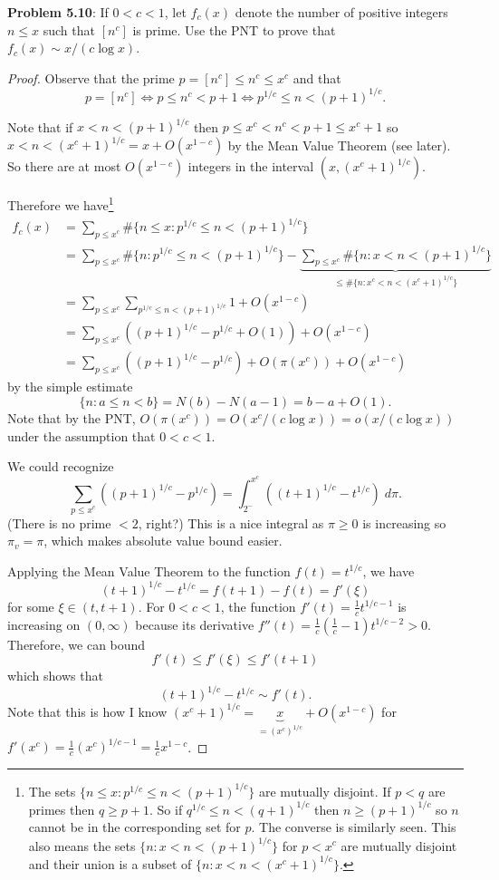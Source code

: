 \documentclass[12pt]{article}
\begin{document}
\fi

\textbf{Problem 5.10}: If $0 < c < 1$, let $f_c(x)$ denote the number of positive integers $n \leq x$ such that $[n^c]$ is prime. Use the PNT to prove that $f_c(x) \sim x/(c \log x)$.

\begin{proof}
Observe that the prime $p = [n^c] \leq n^c \leq x^c$ and that 
$$p = [n^c] \iff p \leq n^c < p + 1 \iff p^{1/c} \leq n < (p + 1)^{1/c}.$$

Note that if $x < n < (p + 1)^{1/c}$ then $p \leq x^c < n^c < p + 1 \leq x^c + 1$ so $x < n < (x^c + 1)^{1/c} = x + O(x^{1-c})$ by the Mean Value Theorem (see later). So there are at most $O(x^{1-c})$ integers in the interval $(x, (x^c + 1)^{1/c})$.

Therefore we have\footnote{The sets $\{n \leq x : p^{1/c} \leq n < (p + 1)^{1/c}\}$ are mutually disjoint. If $p < q$ are primes then $q \geq p + 1$. So if $q^{1/c} \leq n < (q + 1)^{1/c}$ then $n \geq (p + 1)^{1/c}$ so $n$ cannot be in the corresponding set for $p$. The converse is similarly seen. This also means the sets $\{n : x < n < (p+1)^{1/c}\}$ for $p < x^c$ are mutually disjoint and their union is a subset of $\{n : x < n < (x^c + 1)^{1/c}\}$.}
\begin{align*}
f_c(x) &= \sum_{p \leq x^c} \#\{n \leq x : p^{1/c} \leq n < (p + 1)^{1/c}\}\\
&= \sum_{p \leq x^c} \#\{ n : p^{1/c} \leq n < (p + 1)^{1/c} \} - \underbrace{ \sum_{p \leq x^c} \#\{ n : x < n < (p+1)^{1/c} \} }_{\leq \#\{n : x^c < n < (x^c + 1)^{1/c} \}} \\
&= \sum_{p \leq x^c} \sum_{p^{1/c} \leq n < (p + 1)^{1/c}} 1 + O(x^{1-c})\\
&= \sum_{p \leq x^c} \left( (p + 1)^{1/c} - p^{1/c} + O(1) \right) + O(x^{1-c})\\
&= \sum_{p \leq x^c} \left( (p + 1)^{1/c} - p^{1/c} \right) + O(\pi(x^c)) + O(x^{1-c})
\end{align*}
by the simple estimate
$$\{n : a \leq n < b\} = N(b) - N(a - 1) = b - a + O(1).$$
Note that by the PNT, $O(\pi(x^c)) = O(x^c / (c \log x)) = o(x / (c \log x))$ under the assumption that $0 < c < 1$.

We could recognize
$$\sum_{p \leq x^c} \left( (p + 1)^{1/c} - p^{1/c} \right) = \int_{2^-}^{x^c} ((t + 1)^{1/c} - t^{1/c}) \; d \pi.$$
(There is no prime $< 2$, right?) This is a nice integral as $\pi \geq 0$ is increasing so $\pi_v = \pi$, which makes absolute value bound easier.

Applying the Mean Value Theorem to the function $f(t) = t^{1/c}$, we have
$$(t + 1)^{1/c} - t^{1/c} = f(t+1) - f(t) = f'(\xi)$$
for some $\xi \in (t, t+1)$. For $0 < c < 1$, the function $f'(t) = \frac{1}{c} t^{1/c - 1}$ is increasing on $(0, \infty)$ because its derivative $f''(t) = \frac{1}{c} \left( \frac{1}{c} - 1\right) t^{1/c - 2} > 0$. Therefore, we can bound
$$f'(t) \leq f'(\xi) \leq f'(t + 1)$$
which shows that
$$(t + 1)^{1/c} - t^{1/c} \sim f'(t).$$
Note that this is how I know $(x^c + 1)^{1/c} = \underbrace{x}_{= (x^c)^{1/c}} + O(x^{1-c})$ for $f'(x^c) = \frac{1}{c} (x^c)^{1/c - 1} = \frac{1}{c} x^{1 - c}$.


\end{proof}
\end{document}
